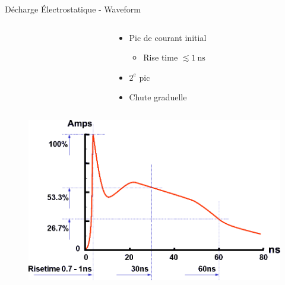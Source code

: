 \begin{frame}{Décharge Électrostatique - Waveform}
    \begin{columns}
        \begin{column}{0.5\textwidth}
        \end{column}
        \begin{column}{0.5\textwidth}
            \begin{itemize}
                \item Pic de courant initial
                \begin{itemize}
                    \item Rise time $\lesssim \SI{1}{\nano\second}$
                \end{itemize}
                \item $2^e$ pic
                \item Chute graduelle
            \end{itemize}
        \end{column}
    \end{columns}

    \vspace{-66pt}

    \begin{figure}
        \centering
        \includegraphics[width=\textwidth]{pictures/ESD-discharge-waveform.png}
    \end{figure}
\end{frame}

